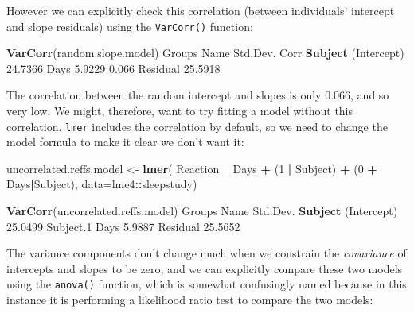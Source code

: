 \documentclass[]{article}
\newenvironment{Shaded}{\begin{snugshade}}{\end{snugshade}}
\newcommand{\DataTypeTok}[1]{\textcolor[rgb]{0.13,0.29,0.53}{#1}}
\newcommand{\DecValTok}[1]{\textcolor[rgb]{0.00,0.00,0.81}{#1}}
\newcommand{\FloatTok}[1]{\textcolor[rgb]{0.00,0.00,0.81}{#1}}
\newcommand{\KeywordTok}[1]{\textcolor[rgb]{0.13,0.29,0.53}{\textbf{#1}}}
\newcommand{\NormalTok}[1]{#1}
\newcommand{\OperatorTok}[1]{\textcolor[rgb]{0.81,0.36,0.00}{\textbf{#1}}}
\newcommand{\StringTok}[1]{\textcolor[rgb]{0.31,0.60,0.02}{#1}}
\begin{document}
However we can explicitly check this correlation (between individuals' intercept
and slope residuals) using the \texttt{VarCorr()} function:

\begin{Shaded}
\begin{Highlighting}[]
\KeywordTok{VarCorr}\NormalTok{(random.slope.model)}
\NormalTok{ Groups   Name        Std.Dev. Corr }
 \KeywordTok{Subject}\NormalTok{  (Intercept) }\FloatTok{24.7366}       
\NormalTok{          Days         }\FloatTok{5.9229}  \FloatTok{0.066}
\NormalTok{ Residual             }\FloatTok{25.5918}       
\end{Highlighting}
\end{Shaded}

The correlation between the random intercept and slopes is only 0.066, and so
very low. We might, therefore, want to try fitting a model without this
correlation. \texttt{lmer} includes the correlation by default, so we need to change
the model formula to make it clear we don't want it:

\begin{Shaded}
\begin{Highlighting}[]
\NormalTok{uncorrelated.reffs.model <-}\StringTok{ }\KeywordTok{lmer}\NormalTok{(}
\NormalTok{  Reaction }\OperatorTok{~}\StringTok{ }\NormalTok{Days }\OperatorTok{+}\StringTok{ }\NormalTok{(}\DecValTok{1} \OperatorTok{|}\StringTok{ }\NormalTok{Subject) }\OperatorTok{+}\StringTok{ }\NormalTok{(}\DecValTok{0} \OperatorTok{+}\StringTok{ }\NormalTok{Days}\OperatorTok{|}\NormalTok{Subject),}
  \DataTypeTok{data=}\NormalTok{lme4}\OperatorTok{::}\NormalTok{sleepstudy)}

\KeywordTok{VarCorr}\NormalTok{(uncorrelated.reffs.model)}
\NormalTok{ Groups    Name        Std.Dev.}
 \KeywordTok{Subject}\NormalTok{   (Intercept) }\FloatTok{25.0499} 
\NormalTok{ Subject}\FloatTok{.1}\NormalTok{ Days         }\FloatTok{5.9887} 
\NormalTok{ Residual              }\FloatTok{25.5652} 
\end{Highlighting}
\end{Shaded}

The variance components don't change much when we constrain the \emph{covariance} of
intercepts and slopes to be zero, and we can explicitly compare these two models
using the \texttt{anova()} function, which is somewhat confusingly named because in
this instance it is performing a likelihood ratio test to compare the two
models:
\end{document}
